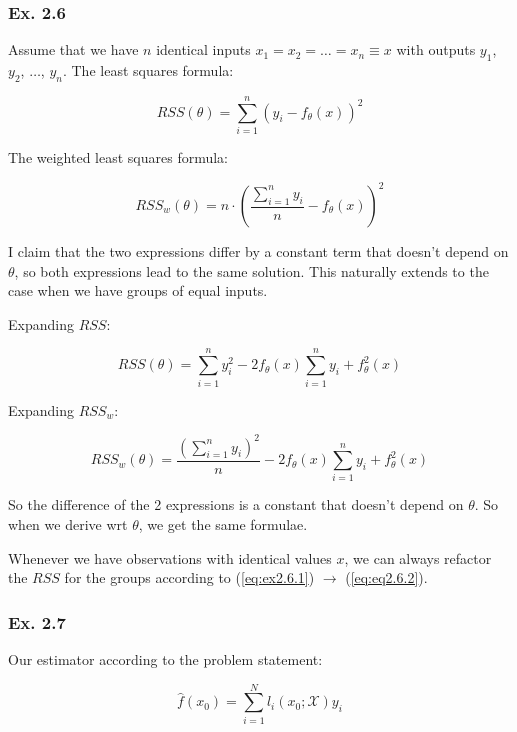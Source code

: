 \documentclass{article}
\begin{document}
\subsubsection{Ex. 2.6}

Assume that we have $n$ identical inputs $x_1 = x_2 = \dots = x_n \equiv x$ with outputs $y_1$, $y_2$, $\dots$, $y_n$. The least squares formula:

\begin{equation} \label{eq:ex2.6.1}
    RSS(\theta) = \sum_{i=1}^{n} (y_i - f_{\theta}(x))^2
\end{equation}

The weighted least squares formula:

\begin{equation} \label{eq:eq2.6.2}
    RSS_w(\theta) = n\cdot \left(\frac{\sum_{i=1}^{n}y_i}{n} - f_{\theta}(x)\right)^2
\end{equation}

I claim that the two expressions differ by a constant term that doesn't depend on $\theta$, so both expressions lead to the same solution. This naturally extends to the case when we have groups of equal inputs.

Expanding $RSS$:

\begin{equation}
    RSS(\theta) = \sum_{i=1}^{n}y_i^2 - 2 f_{\theta}(x) \sum_{i=1}^{n} y_i + f_{\theta}^2(x)
\end{equation}

Expanding $RSS_w$:

\begin{equation}
    RSS_w(\theta) = \frac{\left( \sum_{i=1}^{n} y_i \right)^2}{n} - 2 f_{\theta}(x) \sum_{i=1}^{n} y_i + f_{\theta}^2(x)
\end{equation}

So the difference of the 2 expressions is a constant that doesn't depend on $\theta$. So when we derive wrt $\theta$, we get the same formulae.

Whenever we have observations with identical values $x$, we can always refactor the $RSS$ for the groups according to (\ref{eq:ex2.6.1}) $\to$ (\ref{eq:eq2.6.2}).

\subsubsection{Ex. 2.7}

Our estimator according to the problem statement:

\begin{equation}
    \hat{f}(x_0) = \sum_{i=1}^{N}l_i(x_0;\mathcal{X})y_i
\end{equation}
\end{document}
